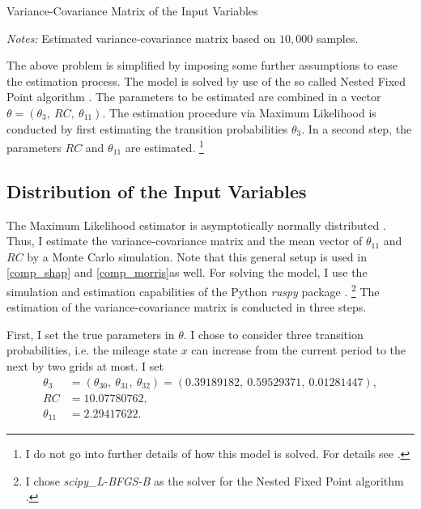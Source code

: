 \begin{table}
	\centering
	\caption{Variance-Covariance Matrix of the Input Variables}
	\label{cov}
	\begin{threeparttable}
	\centering
	
	\begin{tablenotes}
	\small
	\item \textit{Notes:} Estimated variance-covariance matrix based on $10,000$ samples.
	\end{tablenotes}
	\end{threeparttable}
	\end{table}

The above problem is simplified by imposing some further assumptions to ease the estimation process. The model is solved by use of the so called Nested Fixed Point algorithm \citep{R87}. The parameters to be estimated are combined in a vector $\theta=(\theta_3,\ RC,\ \theta_{11}) $. The estimation procedure via Maximum Likelihood is conducted by first estimating the transition probabilities $\theta_3$. In a second step, the parameters $RC$ and $\theta_{11}$ are estimated. \footnote{I do not go into further details of how this model is solved. For details see \citet{R87}.}

\subsection{Distribution of the Input Variables} \label{model_setup}

The Maximum Likelihood estimator is asymptotically normally distributed \citep{R73}. Thus, I estimate the variance-covariance matrix and the mean vector of $\theta_{11}$ and $RC$ by a Monte Carlo simulation. Note that this general setup is used in \cref{comp_shap} and \cref{comp_morris}as well. For solving the model, I use the simulation and estimation capabilities of the Python \textit{ruspy} package \citep{OSE19}. \footnote{I chose \textit{scipy\_L-BFGS-B} as the solver for the Nested Fixed Point algorithm \citep{SP20}.} The estimation of the variance-covariance matrix is conducted in three steps.

First, I set the true parameters in $\theta$. I chose to consider three transition probabilities, i.e. the mileage state $x$ can increase from the current period to the next by two grids at most. I set
\begin{align*}
\theta_3 &= (\theta_{30},\ \theta_{31},\ \theta_{32})=(0.39189182,\ 0.59529371,\ 0.01281447),\\
RC &= 10.07780762,\\
\theta_{11} &= 2.29417622.
\end{align*}

